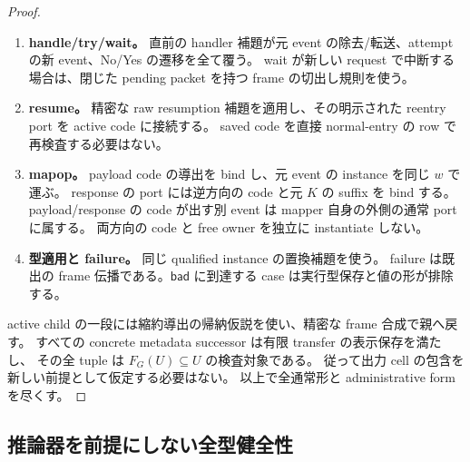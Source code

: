 \documentclass[11pt,a4paper]{article}
\newcommand{\Bad}{\mathsf{bad}}
\begin{document}
\begin{proof}
\begin{enumerate}
\item \textbf{handle/try/wait。}
直前の handler 補題が元 event の除去/転送、attempt の新 event、No/Yes の遷移を全て覆う。
wait が新しい request で中断する場合は、閉じた pending packet を持つ frame の切出し規則を使う。
\item \textbf{resume。}
精密な raw resumption 補題を適用し、その明示された reentry port を active code に接続する。
saved code を直接 normal-entry の row で再検査する必要はない。
\item \textbf{mapop。}
payload code の導出を bind し、元 event の instance を同じ \(w\) で運ぶ。
response の port には逆方向の code と元 \(K\) の suffix を bind する。
payload/response の code が出す別 event は mapper 自身の外側の通常 port に属する。
両方向の code と free owner を独立に instantiate しない。
\item \textbf{型適用と failure。}
同じ qualified instance の置換補題を使う。
failure は既出の frame 伝播である。\(\Bad\) に到達する case は実行型保存と値の形が排除する。
\end{enumerate}
active child の一段には縮約導出の帰納仮説を使い、精密な frame 合成で親へ戻す。
すべての concrete metadata successor は有限 transfer の表示保存を満たし、
その全 tuple は \(F_G(U)\subseteq U\) の検査対象である。
従って出力 cell の包含を新しい前提として仮定する必要はない。
以上で全通常形と administrative form を尽くす。
\end{proof}

\subsection{推論器を前提にしない全型健全性}
\end{document}
